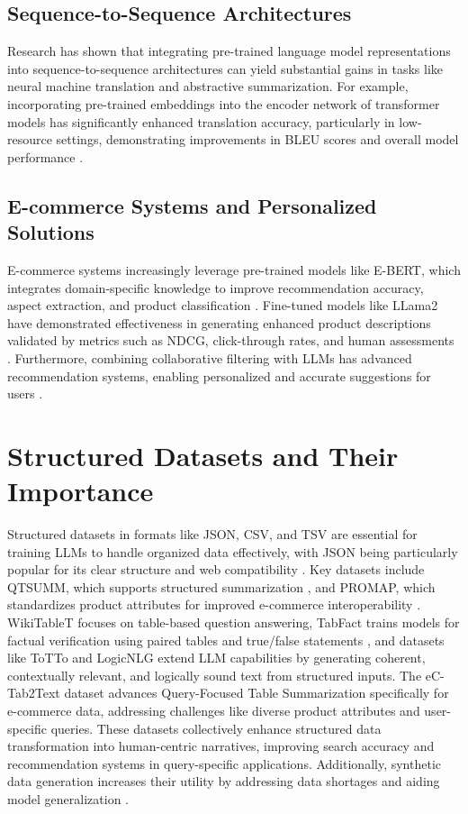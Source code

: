 \subsection{Sequence-to-Sequence Architectures}
Research has shown that integrating pre-trained language model representations into sequence-to-sequence architectures can yield substantial gains in tasks like neural machine translation and abstractive summarization. For example, incorporating pre-trained embeddings into the encoder network of transformer models has significantly enhanced translation accuracy, particularly in low-resource settings, demonstrating improvements in BLEU scores and overall model performance \citep{edunov-etal-2019-pre}.

\subsection{E-commerce Systems and Personalized Solutions}
E-commerce systems increasingly leverage pre-trained models like E-BERT, which integrates domain-specific knowledge to improve recommendation accuracy, aspect extraction, and product classification \citep{zhang2021ebert}. Fine-tuned models like LLama2 have demonstrated effectiveness in generating enhanced product descriptions validated by metrics such as NDCG, click-through rates, and human assessments \citep{zhou2023leveraging}. Furthermore, combining collaborative filtering with LLMs has advanced recommendation systems, enabling personalized and accurate suggestions for users \citep{xu2024emerging}.

\section{Structured Datasets and Their Importance}
Structured datasets in formats like JSON, CSV, and TSV are essential for training LLMs to handle organized data effectively, with JSON being particularly popular for its clear structure and web compatibility \citep{singha2023tabularrepresentationnoisyoperators}. Key datasets include QTSUMM, which supports structured summarization \citep{zhao2023qtsummqueryfocusedsummarizationtabular}, and PROMAP, which standardizes product attributes for improved e-commerce interoperability \citep{macková2023promapdatasetsproductmapping}. WikiTableT focuses on table-based question answering, TabFact trains models for factual verification using paired tables and true/false statements \citep{2019TabFactA}, and datasets like ToTTo \citep{parikh2020tottocontrolledtabletotextgeneration} and LogicNLG \citep{chen2020logicalnaturallanguagegeneration} extend LLM capabilities by generating coherent, contextually relevant, and logically sound text from structured inputs.
The eC-Tab2Text dataset advances Query-Focused Table Summarization specifically for e-commerce data, addressing challenges like diverse product attributes and user-specific queries. These datasets collectively enhance structured data transformation into human-centric narratives, improving search accuracy and recommendation systems in query-specific applications. Additionally, synthetic data generation increases their utility by addressing data shortages and aiding model generalization \citep{suri2023largelanguagemodelsdecision}.


